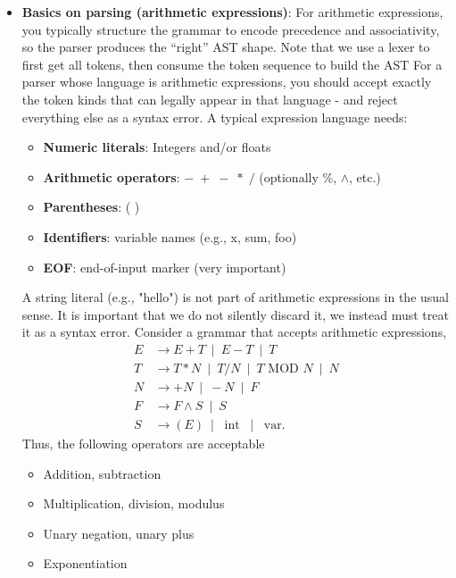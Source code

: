 \documentclass{report}
\begin{document}
\begin{itemize}
        \item \textbf{Basics on parsing (arithmetic expressions)}: For arithmetic expressions, you typically structure the grammar to encode precedence and associativity, so the parser produces the “right” AST shape.
            \bigbreak \noindent 
            Note that we use a lexer to first get all tokens, then consume the token sequence to build the AST
            \bigbreak \noindent 
            For a parser whose language is arithmetic expressions, you should accept exactly the token kinds that can legally appear in that language - and reject everything else as a syntax error.
            \bigbreak \noindent 
            A typical expression language needs:
            \begin{itemize}
                \item \textbf{Numeric literals}: Integers and/or floats
                \item \textbf{Arithmetic operators}: $-\; +\; -\; *\; /$ (optionally \%, $\land$, etc.)
                \item \textbf{Parentheses}: ( )
                \item \textbf{Identifiers}: variable names (e.g., x, sum, foo)
                \item \textbf{EOF}: end-of-input marker (very important)
            \end{itemize}
            A string literal (e.g., "hello") is not part of arithmetic expressions in the usual sense. It is important that we do not silently discard it, we instead must treat it as a syntax error.
            \bigbreak \noindent 
            Consider a grammar that accepts arithmetic expressions,
            \bigbreak \noindent 
            \begin{align*}
                E &\to E + T \ \mid \ E - T  \ \mid \ T \\
                T &\to T * N \ \mid \ T / N \ \mid \ T \text{ MOD } N \ \mid \ N \\
                N &\to +N \ \mid \ -N \ \mid \ F \\
                F &\to F \land S \ \mid \ S \\
                S &\to (E) \ \mid \ \text{ int } \ \mid \ \text{ var}
            .\end{align*}
            Thus, the following operators are acceptable
            \begin{itemize}
                \item Addition, subtraction
                \item Multiplication, division, modulus
                \item Unary negation, unary plus
                \item Exponentiation
            \end{itemize}


\end{itemize}
\end{document}
